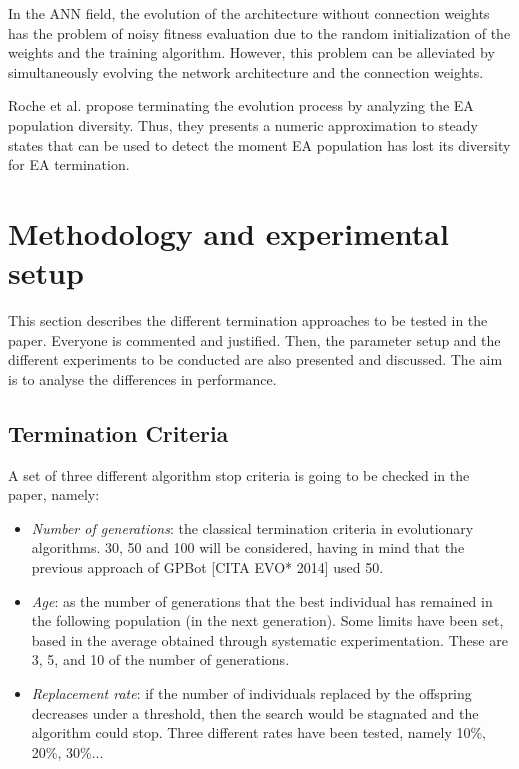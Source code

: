 \documentclass[runningheads,a4paper]{llncs}
\begin{document}
In the ANN field, the evolution of the architecture without connection weights has the problem of noisy fitness evaluation \cite{Zhang2011} due to the random initialization of the weights and the training algorithm. However, this problem can be alleviated by simultaneously evolving the network architecture and the connection weights.



Roche et al. \cite{RocheTermination13} propose terminating the evolution process by analyzing the EA population diversity. Thus, they presents a numeric approximation to steady states that can be used to detect the moment EA population has lost its diversity for EA termination.



\section{Methodology and experimental setup}
\label{sec:met}

This section describes the different termination approaches to be tested in the paper. Everyone is commented and justified.
Then, the parameter setup and the different experiments to be conducted are also presented and discussed. The aim is to analyse the differences in performance.

\subsection{Termination Criteria}
A set of three different algorithm stop criteria is going to be checked in the paper, namely:
\begin{itemize}
    \item \textit{Number of generations}: the classical termination criteria in evolutionary algorithms. 30, 50 and 100 will be considered, having in mind that the previous approach of GPBot [CITA EVO* 2014] used 50.
    \item \textit{Age}: as the number of generations that the best individual has remained in the following population (in the next generation). Some limits have been set, based in the average obtained through systematic experimentation. These are 3, 5, and 10 of the number of generations.
    \item \textit{Replacement rate}: if the number of individuals replaced by the offspring decreases under a threshold, then the search would be stagnated and the algorithm could stop. Three different rates have been tested, namely 10\%, 20\%, 30\%...
\end{itemize}
\end{document}
